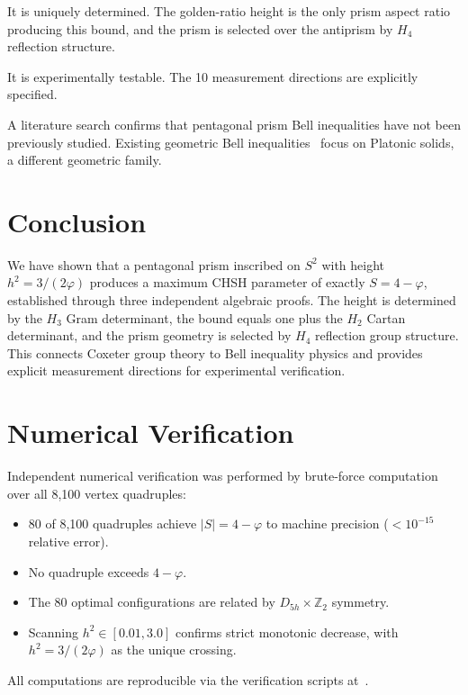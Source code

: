 \documentclass[12pt,a4paper]{article}
\newcommand{\vp}{\varphi}
\begin{document}
It is uniquely determined. The golden-ratio height is the only prism 
aspect ratio producing this bound, and the prism is selected over the 
antiprism by $H_4$ reflection structure.

It is experimentally testable. The 10 measurement directions are 
explicitly specified.

A literature search confirms that pentagonal prism Bell inequalities 
have not been previously studied. Existing geometric Bell 
inequalities~\cite{tavakoli2020} focus on Platonic solids, a different 
geometric family.

\section{Conclusion}
\label{sec:conclusion}

We have shown that a pentagonal prism inscribed on $S^2$ with height 
$h^2 = 3/(2\vp)$ produces a maximum CHSH parameter of exactly 
$S = 4 - \vp$, established through three independent algebraic proofs. 
The height is determined by the $H_3$ Gram determinant, the bound 
equals one plus the $H_2$ Cartan determinant, and the prism geometry is 
selected by $H_4$ reflection group structure. This connects Coxeter 
group theory to Bell inequality physics and provides explicit 
measurement directions for experimental verification.

\appendix

\section{Numerical Verification}
\label{app:numerical}

Independent numerical verification was performed by brute-force computation 
over all 8,100 vertex quadruples:

\begin{itemize}
\item 80 of 8,100 quadruples achieve $|S| = 4 - \vp$ to machine precision 
      ($< 10^{-15}$ relative error).
\item No quadruple exceeds $4 - \vp$.
\item The 80 optimal configurations are related by $D_{5h} \times \mathbb{Z}_2$ 
      symmetry.
\item Scanning $h^2 \in [0.01, 3.0]$ confirms strict monotonic decrease, 
      with $h^2 = 3/(2\vp)$ as the unique crossing.
\end{itemize}

All computations are reproducible via the verification scripts at~\cite{mcgirl_github}.
\end{document}
